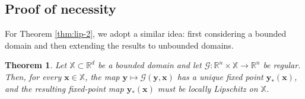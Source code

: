 \documentclass{amsart} %
\def\vx{{\bm{x}}}
\def\vy{{\bm{y}}}
\def\sR{{\mathbb{R}}}
\def\sX{{\mathbb{X}}}
\def\cG{{\mathcal{G}}}
\newtheorem{theorem}{Theorem}[section]
\theoremstyle{definition}
\theoremstyle{remark}
\begin{document}
\subsection{Proof of necessity}

For Theorem \ref{thm:lip-2}, we adopt a similar idea: first considering a bounded domain and then extending the results to unbounded domains.

\begin{theorem}
\label{thm:lip-2-bdd}
Let $\sX\subset\sR^d$ be a \emph{bounded} domain and let $\cG:\sR^n\times\sX\to\sR^n$ be \emph{regular}. Then, for every $\vx\in\sX$, the map $\vy\mapsto \cG(\vy,\vx)$ has a unique fixed point $\vy_\ast(\vx)$, and the resulting fixed-point map $\vy_\ast(\vx)$ must be locally Lipschitz on $\sX$.
\end{theorem}
\end{document}
